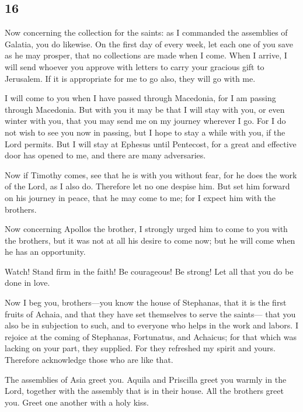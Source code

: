 \begin{paracol}{2}
\begin{otherlanguage}{english}
\hypertarget{section-31}{%
\section{16}\label{section-31}}

 Now concerning the collection for the saints: as I
commanded the assemblies of Galatia, you do likewise.  On
the first day of every week, let each one of you save as he may prosper,
that no collections are made when I come.  When I arrive,
I will send whoever you approve with letters to carry your gracious gift
to Jerusalem.  If it is appropriate for me to go also,
they will go with me.

 I will come to you when I have passed through Macedonia,
for I am passing through Macedonia.  But with you it may
be that I will stay with you, or even winter with you, that you may send
me on my journey wherever I go.  For I do not wish to see
you now in passing, but I hope to stay a while with you, if the Lord
permits.  But I will stay at Ephesus until Pentecost,
 for a great and effective door has opened to me, and
there are many adversaries.

 Now if Timothy comes, see that he is with you without
fear, for he does the work of the Lord, as I also do. 
Therefore let no one despise him. But set him forward on his journey in
peace, that he may come to me; for I expect him with the brothers.

 Now concerning Apollos the brother, I strongly urged him
to come to you with the brothers, but it was not at all his desire to
come now; but he will come when he has an opportunity.

 Watch! Stand firm in the faith! Be courageous! Be
strong!  Let all that you do be done in love.

 Now I beg you, brothers---you know the house of
Stephanas, that it is the first fruits of Achaia, and that they have set
themselves to serve the saints---  that you also be in
subjection to such, and to everyone who helps in the work and labors.
 I rejoice at the coming of Stephanas, Fortunatus, and
Achaicus; for that which was lacking on your part, they supplied.
 For they refreshed my spirit and yours. Therefore
acknowledge those who are like that.

 The assemblies of Asia greet you. Aquila and Priscilla
greet you warmly in the Lord, together with the assembly that is in
their house.  All the brothers greet you. Greet one
another with a holy kiss.


\end{otherlanguage}
\end{paracol}
